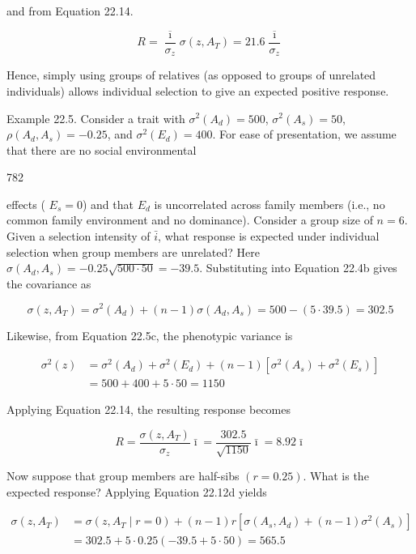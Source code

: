 \documentclass{article}
\begin{document}
and from Equation 22.14.

\begin{equation}
R=\frac{\overline{\imath}}{\sigma_{z}}\sigma(z,A_{T})=21.6\frac{\overline{\imath}}{\sigma_{z}}
\end{equation}

Hence, simply using groups of relatives (as opposed to groups of unrelated individuals) allows individual selection to give an expected positive response.

Example 22.5. Consider a trait with  $ \sigma^2(A_d) = 500 $,  $ \sigma^2(A_s) = 50 $,  $ \rho(A_d, A_s) = -0.25 $, and  $ \sigma^2(E_d) = 400 $. For ease of presentation, we assume that there are no social environmental

782

effects ( $ E_s = 0 $) and that  $ E_d $ is uncorrelated across family members (i.e., no common family environment and no dominance). Consider a group size of  $ n = 6 $. Given a selection intensity of  $ \bar{i} $, what response is expected under individual selection when group members are unrelated? Here  $ \sigma(A_d, A_s) = -0.25 \sqrt{500 \cdot 50} = -39.5 $. Substituting into Equation 22.4b gives the covariance as

\begin{equation}
\sigma(z,A_{T})=\sigma^{2}(A_{d})+(n-1)\sigma(A_{d},A_{s})=500-(5\cdot39.5)=302.5
\end{equation}

Likewise, from Equation 22.5c, the phenotypic variance is

\begin{equation}
\begin{aligned}\sigma^{2}(z)&=\sigma^{2}(A_{d})+\sigma^{2}(E_{d})+(n-1)\left[\sigma^{2}(A_{s})+\sigma^{2}(E_{s})\right]\\&=500+400+5\cdot50=1150\end{aligned}
\end{equation}

Applying Equation 22.14, the resulting response becomes

\begin{equation}
R=\frac{\sigma(z,A_{T})}{\sigma_{z}}\bar{\imath}=\frac{302.5}{\sqrt{1150}}\bar{\imath}=8.92\bar{\imath}
\end{equation}

Now suppose that group members are half-sibs  $ (r = 0.25) $. What is the expected response? Applying Equation 22.12d yields

\begin{equation}
\begin{aligned}\sigma(z,A_{T})&=\sigma(z,A_{T}\mid r=0)+(n-1)r\left[\sigma\left(A_{s},A_{d}\right)+(n-1)\sigma^{2}\left(A_{s}\right)\right]\\&=302.5+5\cdot0.25(-39.5+5\cdot50)=565.5\end{aligned}
\end{equation}
\end{document}
